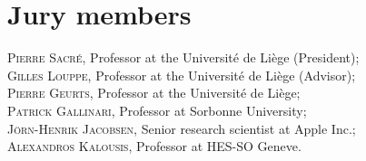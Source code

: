 
\chapter*{Jury members}


\noindent \textsc{Pierre Sacr{\'e}}, Professor at the Universit{\'e} de Li{\`e}ge (President); \\

\noindent \textsc{Gilles Louppe}, Professor at the Universit{\'e} de Li{\`e}ge (Advisor); \\

\noindent \textsc{Pierre Geurts}, Professor at the Universit{\'e} de Li{\`e}ge; \\

\noindent \textsc{Patrick Gallinari}, Professor at Sorbonne University; \\

\noindent \textsc{J{\"o}rn-Henrik Jacobsen}, Senior research scientist at Apple Inc.; \\

\noindent \textsc{Alexandros Kalousis}, Professor at HES-SO Geneve. \\
